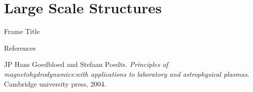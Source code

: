 \documentclass{beamer}
\begin{document}
\section{Large Scale Structures}
\begin{frame}{Frame Title}
    
\end{frame}

\begin{frame}{References}
    \begin{itemize}\footnotesize{
        \item JP Hans Goedbloed and Stefaan Poedts. \textit{Principles of magnetohydrodynamics:with applications to laboratory and astrophysical plasmas.} Cambridge university press, 2004.
    }
    \end{itemize}
\end{frame}
\end{document}
